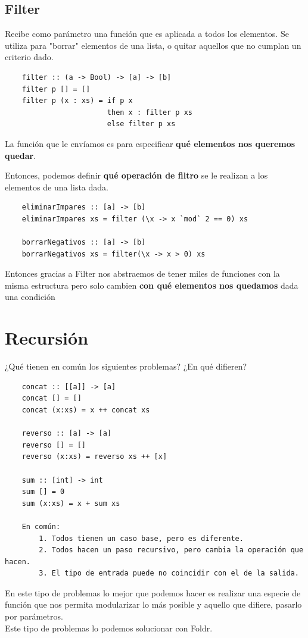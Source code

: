\documentclass[10pt,a4paper]{article}
\begin{document}
\subsection*{Filter}
Recibe como parámetro una función que es aplicada a todos los elementos. Se utiliza para "borrar" elementos de una lista, o quitar aquellos que no cumplan un criterio dado. 
\begin{lstlisting}
    filter :: (a -> Bool) -> [a] -> [b]
    filter p [] = []
    filter p (x : xs) = if p x
                        then x : filter p xs 
                        else filter p xs
\end{lstlisting}

La función que le envíamos es para especificar \textbf{qué elementos nos queremos quedar}.

Entonces, podemos definir \textbf{qué operación de filtro} se le realizan a los elementos de una lista dada.
\begin{lstlisting}
    eliminarImpares :: [a] -> [b]
    eliminarImpares xs = filter (\x -> x `mod` 2 == 0) xs 

    borrarNegativos :: [a] -> [b]
    borrarNegativos xs = filter(\x -> x > 0) xs 
\end{lstlisting}
Entonces gracias a Filter nos abstraemos de tener miles de funciones con la misma estructura pero solo cambien \textbf{con qué elementos nos quedamos} dada una condición
\section*{Recursión}
¿Qué tienen en común los siguientes problemas? ¿En qué difieren? 
\begin{lstlisting}
    concat :: [[a]] -> [a]
    concat [] = []
    concat (x:xs) = x ++ concat xs

    reverso :: [a] -> [a]
    reverso [] = []
    reverso (x:xs) = reverso xs ++ [x]

    sum :: [int] -> int 
    sum [] = 0
    sum (x:xs) = x + sum xs

    En común: 
        1. Todos tienen un caso base, pero es diferente.
        2. Todos hacen un paso recursivo, pero cambia la operación que hacen. 
        3. El tipo de entrada puede no coincidir con el de la salida.
\end{lstlisting}
En este tipo de problemas lo mejor que podemos hacer es realizar una especie de función que nos permita modularizar lo más posible y aquello que difiere, pasarlo por parámetros. \\
Este tipo de problemas lo podemos solucionar con Foldr. 
\end{document}
